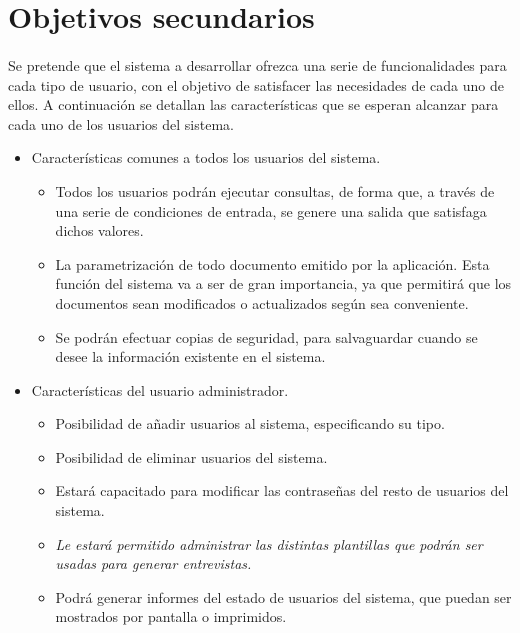 \section{Objetivos secundarios}

\paragraph{}Se pretende que el sistema a desarrollar ofrezca una serie de
funcionalidades para cada tipo de usuario, con el objetivo de satisfacer las
necesidades de cada uno de ellos. A continuación se detallan las características
que se esperan alcanzar para cada uno de los usuarios del sistema.


\begin{itemize}
   \item Características comunes a todos los usuarios del sistema.
      \begin{itemize}
         \item Todos los usuarios podrán ejecutar consultas, de forma que, a
         través de una serie de condiciones de entrada, se genere una salida que
         satisfaga dichos valores.
         \item La parametrización de todo documento emitido por la aplicación.
         Esta función del sistema va a ser de gran importancia, ya que permitirá
         que los documentos sean modificados o actualizados según sea
         conveniente.
         \item Se podrán efectuar copias de seguridad, para salvaguardar cuando
         se desee la información existente en el sistema.
      \end{itemize}

   \item Características del usuario administrador.
      \begin{itemize}
         \item Posibilidad de añadir usuarios al sistema, especificando su tipo.
         \item Posibilidad de eliminar usuarios del sistema.
         \item Estará capacitado para modificar las contraseñas del resto de
         usuarios del sistema.
         \item \textit{Le estará permitido administrar las distintas plantillas
         que podrán ser usadas para generar entrevistas.}
         \item Podrá generar informes del estado de usuarios del sistema, que
         puedan ser mostrados por pantalla o imprimidos.
      \end{itemize}



\end{itemize}
